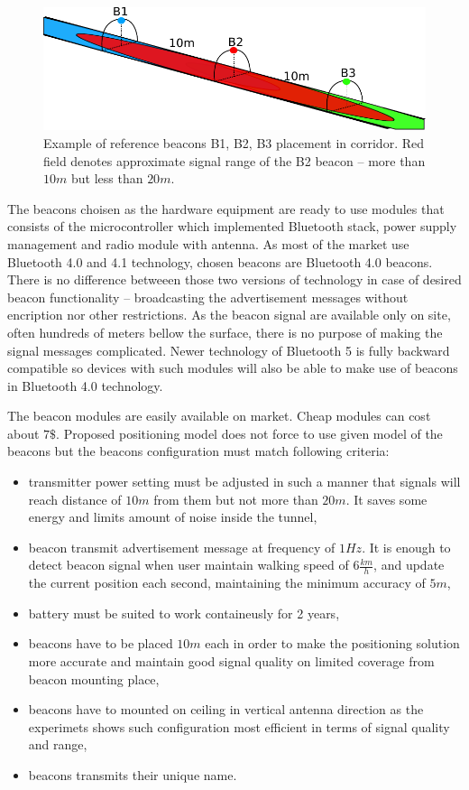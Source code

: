 \documentclass[../main.tex]{subfiles}
\begin{document}
\begin{figure}[!htbp]
\includegraphics[width=\textwidth,clip]{pictures/beacons_placement.pdf}
\centering
\caption{Example of reference beacons B1, B2, B3 placement in corridor. Red field denotes approximate signal range of the B2 beacon -- more than $10m$ but less than $20m$.}
\label{fig:beacons_placement}
\end{figure}


The beacons choisen as the hardware equipment are ready to use modules that consists of the microcontroller which implemented Bluetooth stack, power supply management and radio module with antenna. As most of the market use Bluetooth 4.0 and 4.1 technology, chosen beacons are Bluetooth 4.0 beacons. There is no difference betweeen those two versions of technology in case of desired beacon functionality -- broadcasting the advertisement messages without encription nor other restrictions. As the beacon signal are available only on site, often hundreds of meters bellow the surface, there is no purpose of making the signal messages complicated. Newer technology of Bluetooth 5 is fully backward compatible so devices with such modules will also be able to make use of beacons in Bluetooth 4.0 technology.

The beacon modules are easily available on market. Cheap modules can cost about $7\$$. Proposed positioning model does not force to use given model of the beacons but the beacons configuration must match following criteria:
\begin{itemize}
	\item transmitter power setting must be adjusted in such a manner that signals will reach distance of $10m$ from them but not more than $20m$. It saves some energy and limits amount of noise inside the tunnel,
	\item beacon transmit advertisement message at frequency of $1Hz$. It is enough to detect beacon signal when user maintain walking speed of $6\frac{km}{h}$, and update the current position each second, maintaining the minimum accuracy of $5m$,
	\item battery must be suited to work containeusly for 2 years,
	\item beacons have to be placed $10m$ each in order to make the positioning solution more accurate and maintain good signal quality on limited coverage from beacon mounting place,
	\item beacons have to mounted on ceiling in vertical antenna direction as the experimets shows such configuration most efficient in terms of signal quality and range,
	\item beacons transmits their unique name.
\end{itemize}
\end{document}
